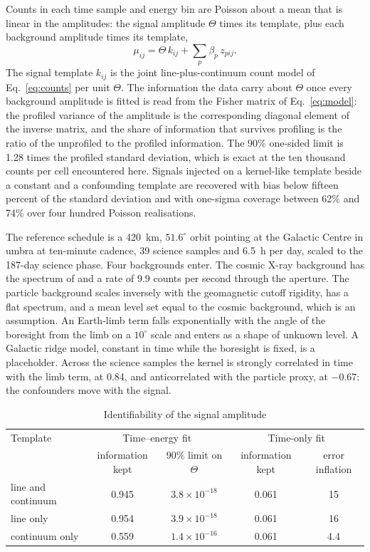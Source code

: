 \documentclass[11pt]{article}
\newcommand{\Th}{\Theta}
\begin{document}
Counts in each time sample and energy bin are Poisson about a mean that is linear in the amplitudes: the signal amplitude $\Th$ times its template, plus each background amplitude times its template,
\begin{equation}
\mu_{ij}=\Th\,k_{ij}+\sum_p\beta_p\,z_{pij}.
\label{eq:model}
\end{equation}
The signal template $k_{ij}$ is the joint line-plus-continuum count model of Eq.~\eqref{eq:counts} per unit $\Th$. The information the data carry about $\Th$ once every background amplitude is fitted is read from the Fisher matrix of Eq.~\eqref{eq:model}: the profiled variance of the amplitude is the corresponding diagonal element of the inverse matrix, and the share of information that survives profiling is the ratio of the unprofiled to the profiled information. The 90\% one-sided limit is 1.28 times the profiled standard deviation, which is exact at the ten thousand counts per cell encountered here. Signals injected on a kernel-like template beside a constant and a confounding template are recovered with bias below fifteen percent of the standard deviation and with one-sigma coverage between 62\% and 74\% over four hundred Poisson realisations.

The reference schedule is a 420~km, $51.6^\circ$ orbit pointing at the Galactic Centre in umbra at ten-minute cadence, 39 science samples and 6.5~h per day, scaled to the 187-day science phase. Four backgrounds enter. The cosmic X-ray background has the spectrum of \citet{deluca2004cxb} and a rate of 9.9 counts per second through the aperture. The particle background scales inversely with the geomagnetic cutoff rigidity, has a flat spectrum, and a mean level set equal to the cosmic background, which is an assumption. An Earth-limb term falls exponentially with the angle of the boresight from the limb on a $10^\circ$ scale and enters as a shape of unknown level. A Galactic ridge model, constant in time while the boresight is fixed, is a placeholder. Across the science samples the kernel is strongly correlated in time with the limb term, at 0.84, and anticorrelated with the particle proxy, at $-0.67$: the confounders move with the signal.

\begin{table}[t]
\centering
\caption{Identifiability of the signal amplitude}
\label{tab:identifiability}
\begin{tabular}{lcccc}
\toprule
Template & \multicolumn{2}{c}{Time--energy fit} & \multicolumn{2}{c}{Time-only fit}\\
 & information kept & 90\% limit on $\Th$ & information kept & error inflation\\
\midrule
line and continuum & 0.945 & $3.8\times10^{-18}$ & 0.061 & 15\\
line only & 0.954 & $3.9\times10^{-18}$ & 0.061 & 16\\
continuum only & 0.559 & $1.4\times10^{-16}$ & 0.061 & 4.4\\
\bottomrule
\end{tabular}
\end{table}
\end{document}
